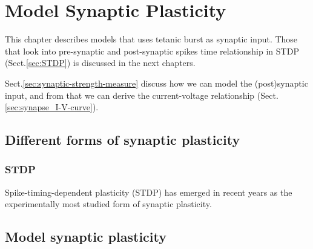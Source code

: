 
\chapter{Model Synaptic Plasticity}
\label{chap:synapse-model-interc}

This chapter describes models that uses tetanic burst as synaptic input.
Those that look into pre-synaptic and post-synaptic spikes time relationship
in STDP (Sect.\ref{sec:STDP}) is discussed in the next chapters.

Sect.\ref{sec:synaptic-strength-measure} discuss how we can model the
(post)synaptic input, and from that we can derive the current-voltage
relationship (Sect.\ref{sec:synapse_I-V-curve}).

\section{Different forms of synaptic plasticity}

\subsection{STDP}

Spike-timing-dependent plasticity (STDP) has emerged in recent years as
the  experimentally  most  studied  form  of  synaptic  plasticity.


\section{Model synaptic plasticity}
\label{sec:synaptic_plasticity_model}

